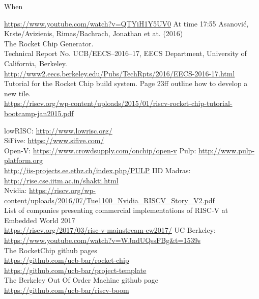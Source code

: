 \documentclass[journal,a4paper]{IEEEtran}
\begin{document}
When 







\bigskip

\begin{thebibliography}{1}
	\url{https://www.youtube.com/watch?v=QTYiH1Y5UV0} At time 17:55
	Asanovi\'c, Krste/Avizienis, Rimas/Bachrach, Jonathan et at. (2016)\\
	The Rocket Chip Generator.\\
	Technical Report No. UCB/EECS--2016--17, EECS Department, University of California, Berkeley.\\
	\url{http://www2.eecs.berkeley.edu/Pubs/TechRpts/2016/EECS-2016-17.html}\\

	Tutorial for the  Rocket Chip build system. Page 23ff outline how to develop a new tile.\\
	\url{https://riscv.org/wp-content/uploads/2015/01/riscv-rocket-chip-tutorial-bootcamp-jan2015.pdf}

		lowRISC: \url{http://www.lowrisc.org/}\\
		SiFive: \url{https://www.sifive.com/}\\
		Open-V: \url{https://www.crowdsupply.com/onchip/open-v}
		Pulp: \url{http://www.pulp-platform.org}\\
		\url{http://iis-projects.ee.ethz.ch/index.php/PULP}
		IID Madras: \url{http://rise.cse.iitm.ac.in/shakti.html}\\
		Nvidia: \url{https://riscv.org/wp-content/uploads/2016/07/Tue1100_Nvidia_RISCV_Story_V2.pdf}\\
		List of companies presenting commercial implementations of RISC-V at Embedded World 2017\\
		\url{https://riscv.org/2017/03/risc-v-mainstream-ew2017/}
		UC Berkeley: \url{https://www.youtube.com/watch?v=WJndUQssFBg&t=1539s}\\
	The RocketChip github pages\\
	\url{https://github.com/ucb-bar/rocket-chip}\\
	\url{https://github.com/ucb-bar/project-template}\\

	The Berkeley Out Of Order Machine github page\\
	\url{https://github.com/ucb-bar/riscv-boom}\\


\end{thebibliography}
\end{document}
